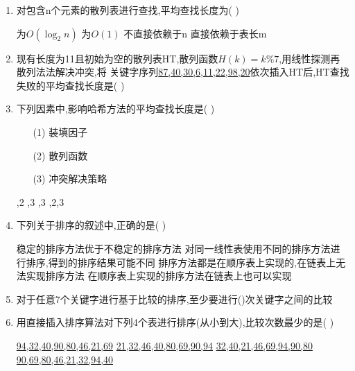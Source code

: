 \documentclass[12pt, a4paper, oneside, UTF8]{ctexbook}
\begin{document}
\begin{enumerate}
    \item 对包含n个元素的散列表进行查找,平均查找长度为(   ) 
    \begin{choices}
        \task 为$O(\log_{2}{n})$
        \task 为$O(1)$
        \task 不直接依赖于n
        \task 直接依赖于表长m
    \end{choices}

    \item \bl 现有长度为11且初始为空的散列表HT,散列函数$H(k)=k\%7$,用线性探测再散列法法解决冲突,将
    关键字序列\underline{87,40,30,6,11,22,98,20}依次插入HT后,HT查找失败的平均查找长度是(   )
    \begin{choices}
    \end{choices}

    \item \bl 下列因素中,影响哈希方法的平均查找长度是(   ) 
    \begin{enumerate}
        \item [(1)] 装填因子
        \item [(2)] 散列函数
        \item [(3)] 冲突解决策略
    \end{enumerate}
    \begin{choices}
        ,2
        ,3
        ,3
        ,2,3
    \end{choices}

    \item 下列关于排序的叙述中,正确的是(   ) 
    \begin{choices}[1]
        \task 稳定的排序方法优于不稳定的排序方法
        \task 对同一线性表使用不同的排序方法进行排序,得到的排序结果可能不同
        \task 排序方法都是在顺序表上实现的,在链表上无法实现排序方法
        \task 在顺序表上实现的排序方法在链表上也可以实现
    \end{choices}

    \item 对于任意7个关键字进行基于比较的排序,至少要进行()次关键字之间的比较
    \begin{choices}
    \end{choices}

    \item 用直接插入排序算法对下列4个表进行排序(从小到大),比较次数最少的是(   ) 
    \begin{choices}[2]
        \task \underline{94,32,40,90,80,46,21,69}
        \task \underline{21,32,46,40,80,69,90,94}
        \task \underline{32,40,21,46,69,94,90,80}
        \task \underline{90,69,80,46,21,32,94,40}
    \end{choices}


\end{enumerate}
\end{document}
